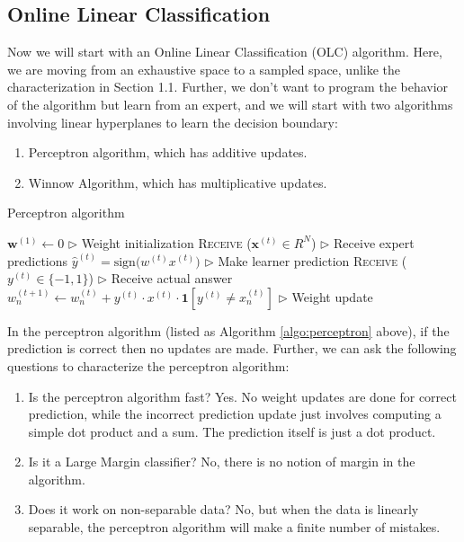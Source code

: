\documentclass[11pt]{article}
\begin{document}
\subsection{Online Linear Classification}

Now we will start with an Online Linear Classification (OLC) algorithm. Here, we are moving from an exhaustive space to a sampled space, unlike the characterization in Section 1.1. Further, we don't want to program the behavior of the algorithm but learn from an expert, and we will start with two algorithms involving linear hyperplanes to learn the decision boundary:
\begin{enumerate}
    \item Perceptron algorithm, which has additive updates.
    \item Winnow Algorithm, which has multiplicative updates.
\end{enumerate}
\begin{algorithm}[H]
\caption{Perceptron algorithm}
\label{algo:perceptron}
\begin{algorithmic}[1]
\STATE $\textbf{w}^{(1)} \leftarrow 0$ \hfill $\triangleright$ Weight initialization
\STATE \textsc{Receive} ($\textbf{x}^{(t)}\in R^N$) \hfill $\triangleright$ Receive expert predictions
\STATE $\hat{y}^{(t)} = \text{sign}\Big(w^{(t)} x^{(t)}\Big)$ \hfill $\triangleright$ Make learner prediction
\STATE \textsc{Receive} ($y^{(t)}\in\{-1, 1\}$) \hfill $\triangleright$ Receive actual answer
\STATE $w_n^{(t+1)}\leftarrow w_n^{(t)} + y^{(t)} \cdot x^{(t)} \cdot\textbf{1}[y^{(t)}\neq x_n^{(t)}] $ \hfill $\triangleright$ Weight update
\ENDFOR
\end{algorithmic}
\end{algorithm}

In the perceptron algorithm (listed as Algorithm \ref{algo:perceptron} above), if the prediction is correct then no updates are made. Further, we can ask the following questions to characterize the perceptron algorithm:

\begin{enumerate}
    \item Is the perceptron algorithm fast? Yes. No weight updates are done for correct prediction, while the incorrect prediction update just involves computing a simple dot product and a sum. The prediction itself is just a dot product.
    \item Is it a Large Margin classifier? No, there is no notion of margin in the algorithm.
    \item Does it work on non-separable data? No, but when the data is linearly separable, the perceptron algorithm will make a finite number of mistakes.
\end{enumerate}
\end{document}
